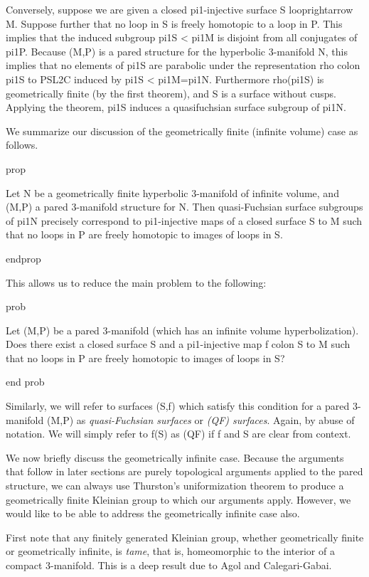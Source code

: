 Conversely, suppose we are given a closed pi1-injective surface
S looprightarrow M.  Suppose further that no loop in S is freely homotopic to
a loop in P. This implies that the induced subgroup pi1S < pi1M is disjoint
from all conjugates of pi1P. Because (M,P) is a pared structure for the
hyperbolic 3-manifold N, this implies that no elements of pi1S are parabolic
under the representation rho colon pi1S to PSL2C induced by pi1S < pi1M=pi1N.
Furthermore rho(pi1S) is geometrically finite (by the first theorem), and S is
a surface without cusps.  Applying the theorem, pi1S induces a quasifuchsian
surface subgroup of pi1N.

We summarize our discussion of the geometrically finite (infinite volume) case
as follows.

prop

Let N be a geometrically finite hyperbolic 3-manifold of infinite volume, and
(M,P) a pared 3-manifold structure for N. Then quasi-Fuchsian surface subgroups
of pi1N precisely correspond to pi1-injective maps of a closed surface S to
M such that no loops in P are freely homotopic to images of loops in S.

endprop

This allows us to reduce the main problem to the following:

prob

Let (M,P) be a pared 3-manifold (which has an infinite volume hyperbolization).
Does there exist a closed surface S and a pi1-injective map f colon S to M such
that no loops in P are freely homotopic to images of loops in S?

end prob

Similarly, we will refer to surfaces (S,f) which satisfy this condition for
a pared 3-manifold (M,P) as \emph{quasi-Fuchsian surfaces} or \emph{(QF)
surfaces}.  Again, by abuse of notation. We will simply refer to f(S) as (QF)
if f and S are clear from context.

We now briefly discuss the geometrically infinite case. Because the arguments
that follow in later sections are purely topological arguments applied to the
pared structure, we can always use Thurston's uniformization theorem to produce
a geometrically finite Kleinian group to which our arguments apply. However, we
would like to be able to address the geometrically infinite case also.

First note that any finitely generated Kleinian group, whether geometrically
finite or geometrically infinite, is \emph{tame}, that is, homeomorphic to the
interior of a compact 3-manifold. This is a deep result due to Agol and
Calegari-Gabai.

